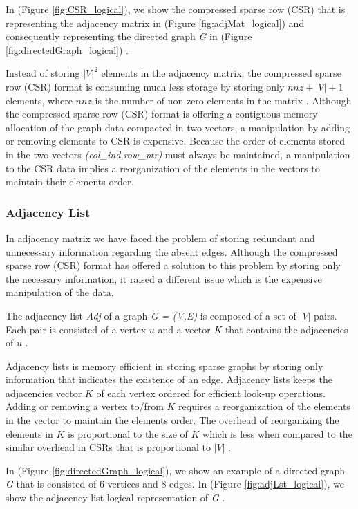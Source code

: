 {In (Figure \ref{fig:CSR_logical}), we show the compressed sparse row (CSR) that is representing the adjacency matrix in (Figure \ref{fig:adjMat_logical}) and consequently representing the directed graph \textit{G} in (Figure \ref{fig:directedGraph_logical}) \cite{Bai:2000:TSA:357352}.

Instead of storing $|V|^2$ elements in the adjacency matrix, the compressed sparse row (CSR) format is consuming much less storage by storing only $nnz + |V| + 1$ elements, where $nnz$ is the number of non-zero elements in the matrix \cite{Bai:2000:TSA:357352}. Although the compressed sparse row (CSR) format is offering a contiguous memory allocation of the graph data compacted in two vectors, a manipulation by adding or removing elements to CSR is expensive. Because the order of elements stored in the two vectors \textit{(col\_ind,row\_ptr)} must always be maintained, a manipulation to the CSR data implies a reorganization of the elements in the vectors to maintain their elements order.

\subsubsection{Adjacency List}
\label{subsubsec:AdjacencyList}

In adjacency matrix we have faced the problem of storing redundant and unnecessary information regarding the absent edges. Although the compressed sparse row (CSR) format has offered a solution to this problem by storing only the necessary information, it raised a different issue which is the expensive manipulation of the data.

The adjacency list \textit{Adj} of a graph \textit{G = (V,E)} is composed of a set of $|V|$ pairs. Each pair is consisted of a vertex $u$ and a vector $K$ that contains the adjacencies of $u$ \cite{van1998python}.

Adjacency lists is memory efficient in storing sparse graphs by storing only information that indicates the existence of an edge. Adjacency lists keeps the adjacencies vector $K$ of each vertex ordered for efficient look-up operations. Adding or removing a vertex to/from $K$ requires a reorganization of the elements in the vector to maintain the elements order. The overhead of reorganizing the elements in $K$ is proportional to the size of $K$ which is less when compared to the similar overhead in CSRs that is proportional to $|V|$ \cite{van1998python}.

In (Figure \ref{fig:directedGraph_logical}), we show an example of a directed graph \textit{G} that is consisted of 6 vertices and 8 edges. In (Figure \ref{fig:adjLst_logical}), we show the adjacency list logical representation of \textit{G} \cite{cormen2009introduction}. 

}
